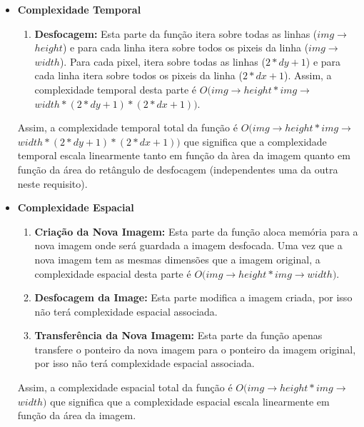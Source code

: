 \begin{itemize}

\item
\textbf{Complexidade Temporal}

\begin{enumerate}
    \item \textbf{Desfocagem:} Esta parte da função itera sobre todas as linhas ($img$$\rightarrow$$height$) e para cada linha itera sobre todos os pixeis da linha ($img$$\rightarrow$$width$). Para cada pixel, itera sobre todas as linhas ($2 * dy + 1$) e para cada linha itera sobre todos os pixeis da linha ($2 * dx + 1$). Assim, a complexidade temporal desta parte é $O(img$$\rightarrow$$height * img$$\rightarrow$$width * (2 * dy + 1) * (2 * dx + 1))$.
\end{enumerate}

        Assim, a complexidade temporal total da função é $O(img$$\rightarrow$$height * img$$\rightarrow$$width * (2 * dy + 1) * (2 * dx + 1))$ que significa que a complexidade temporal escala linearmente tanto em função da àrea da imagem quanto em função da área do retângulo de desfocagem (independentes uma da outra neste requisito).

\item

\textbf{Complexidade Espacial}

\begin{enumerate}
    \item \textbf{Criação da Nova Imagem:} Esta parte da função aloca memória para a nova imagem onde será guardada a imagem desfocada. Uma vez que a nova imagem tem as mesmas dimensões que a imagem original, a complexidade espacial desta parte é $O(img$$\rightarrow$$height * img$$\rightarrow$$width)$.
    \item \textbf{Desfocagem da Image:} Esta parte modifica a imagem criada, por isso não terá complexidade espacial associada.
    \item \textbf{Transferência da Nova Imagem:} Esta parte da função apenas transfere o ponteiro da nova imagem para o ponteiro da imagem original, por isso não terá complexidade espacial associada.
\end{enumerate}

Assim, a complexidade espacial total da função é $O(img$$\rightarrow$$height * img$$\rightarrow$$width)$ que significa que a complexidade espacial escala linearmente em função da área da imagem.

\end{itemize}


